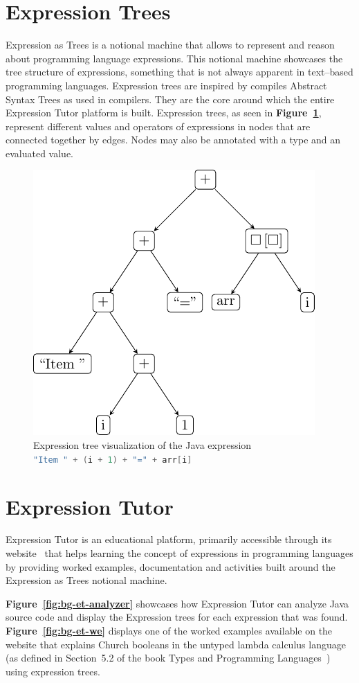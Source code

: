 \begin{chapterBody}
\section{Expression Trees}\label{sec:bg-rw-le-et}

Expression as Trees is a notional machine that allows to represent and
reason about programming language expressions.
This notional machine showcases the tree structure of expressions, something
that is not always apparent in text–based programming languages.
Expression trees are inspired by compiles Abstract Syntax Trees as used in
compilers. They are the core around which the entire Expression Tutor
platform is built. Expression trees, as seen in
\textbf{Figure~\ref{fig:bg-etree}}, represent different values and
operators of expressions in nodes that are connected together by edges.
Nodes may also be annotated with a type and an evaluated value.

\begin{figure}[ht]
\centering
\includegraphics[height=.3\textwidth]{res/2/expression_tree_generic.pdf}
\caption{Expression tree visualization of the Java expression\\
\lstinline[language=Java]{"Item " + (i + 1) + "=" + arr[i]}}
\label{fig:bg-etree}
\end{figure}

\section{Expression Tutor}

Expression Tutor is an educational platform, primarily accessible through its
website~\cite{matthias_hauswirth_expression_2023} that helps learning the
concept of expressions in programming languages by providing worked examples,
documentation and activities built around the Expression as Trees notional
machine.

\textbf{Figure~\ref{fig:bg-et-analyzer}} showcases how Expression Tutor can
analyze Java source code and display the Expression trees for each expression
that was found. \textbf{Figure~\ref{fig:bg-et-we}} displays one of the worked
examples available on the website that explains Church booleans in the untyped
lambda calculus language (as defined in Section~5.2 of the book Types and 
Programming Languages~\cite{pierce_types_2002}) using expression trees.


\end{chapterBody}
